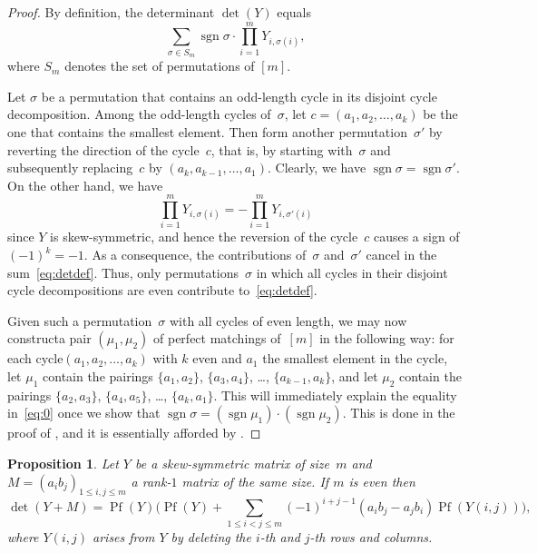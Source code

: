 \documentclass[12pt,reqno]{amsart}
\numberwithin{equation}{section}
\newtheorem{proposition}[theorem]{Proposition}
\theoremstyle{definition}
\theoremstyle{remark}
\def\sgn{\operatorname{sgn}}
\def\Pf{\operatorname{Pf}}
\def\si{\sigma}
\begin{document}
\begin{proof}
By definition, the determinant $\det(Y)$ equals
\begin{equation} \label{eq:detdef} 
\sum_{\si\in S_m}\sgn\si\cdot
\prod _{i=1} ^{m}Y_{i,\si(i)},
\end{equation}
where $S_m$ denotes the set of permutations of $[m]$.

Let $\si$ be a permutation that contains an odd-length cycle
in its disjoint cycle decomposition.
Among the odd-length cycles of~$\si$, 
let $c=(a_1,a_2,\dots,a_k)$ be the one that contains the smallest
element. Then form another permutation~$\si'$ by reverting the
direction of the cycle~$c$, that is, by starting with~$\si$
and subsequently replacing~$c$ by $(a_k,a_{k-1},\dots,a_1)$.
Clearly, we have $\sgn\si=\sgn\si'$. On the other hand, we have
$$
\prod _{i=1} ^{m}Y_{i,\si(i)}
=-\prod _{i=1} ^{m}Y_{i,\si'(i)}
$$
since $Y$ is skew-symmetric, and hence the reversion of the
cycle~$c$ causes a sign of $(-1)^k=-1$. As a consequence, the
contributions of~$\si$ and~$\si'$ cancel in the
sum~\eqref{eq:detdef}. Thus, only permutations~$\si$ in which all
cycles in their disjoint cycle decompositions are even contribute
to~\eqref{eq:detdef}.

Given such a permutation~$\si$ with all cycles of even length,
we may now construct\break a pair $(\mu_1,\mu_2)$ of perfect matchings
of~$[m]$ in the following way: for each cycle\break $(a_1,a_2,\dots,a_k)$
with $k$ even and $a_1$ the smallest element in the cycle, let
$\mu_1$ contain the pairings $\{a_1,a_2\}$, $\{a_3,a_4\}$, \dots,
$\{a_{k-1},a_k\}$, and let
$\mu_2$ contain the pairings $\{a_2,a_3\}$, $\{a_4,a_5\}$, \dots,
$\{a_{k},a_1\}$.
This will immediately explain the equality in~\eqref{eq:0}
once we show that $\sgn\si=(\sgn\mu_1)\cdot(\sgn\mu_2)$.
This is done in the proof of \cite[Prop.~2.2]{StemAE}, and it is
essentially afforded by \cite[Lemma~2.1]{StemAE}.
\end{proof}


\begin{proposition} \label{prop:1}
Let $Y$ be a skew-symmetric matrix of size~$m$ and
$M=(a_ib_j)_{1\le i,j\le m}$ a rank-$1$ matrix of the same size.
If $m$ is even then 
\begin{equation} \label{eq:2} 
\det(Y+M)=\Pf(Y)\Bigg(\Pf(Y)
+\sum_{1\le i< j\le m}(-1)^{i+j-1}(a_ib_j-a_jb_i)
\Pf(Y(i,j))\Bigg),
\end{equation}
where $Y(i,j)$ arises from $Y$ by deleting the $i$-th and $j$-th
rows and columns.
\end{proposition}
\end{document}
